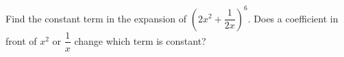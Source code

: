 Find the constant term in the expansion of $\left(2x^2+\dfrac{1}{2x}\right)^6$. Does a coefficient in front of $x^2$ or $\dfrac{1}{x}$ change which term is constant?
